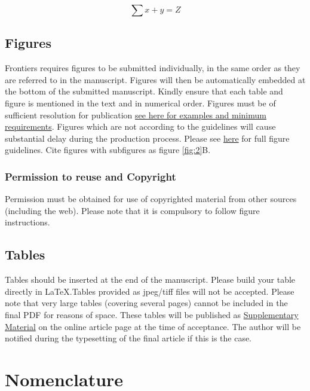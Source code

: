\documentclass[utf8]{frontiersSCNS} %
\begin{document}
\begin{equation}
\sum x+ y =Z\label{eq:01}
\end{equation}

\subsection{Figures}
Frontiers requires figures to be submitted individually, in the same order as they are referred to in the manuscript. Figures will then be automatically embedded at the bottom of the submitted manuscript. Kindly ensure that each table and figure is mentioned in the text and in numerical order. Figures must be of sufficient resolution for publication \href{http://home.frontiersin.org/about/author-guidelines#ResolutionRequirements}{see here for examples and minimum requirements}. Figures which are not according to the guidelines will cause substantial delay during the production process. Please see \href{http://home.frontiersin.org/about/author-guidelines#GeneralStyleGuidelinesforFigures}{here} for full figure guidelines. Cite figures with subfigures as figure \ref{fig:2}B.


\subsubsection{Permission to reuse and Copyright}
Permission must be obtained for use of copyrighted material from other sources (including the web). Please note that it is compulsory to follow figure instructions. 

\subsection{Tables}
Tables should be inserted at the end of the manuscript. Please build your table directly in LaTeX.Tables provided as jpeg/tiff files will not be accepted. Please note that very large tables (covering several pages) cannot be included in the final PDF for reasons of space. These tables will be published as \href{http://home.frontiersin.org/about/author-guidelines#SupplementaryMaterial}{Supplementary Material} on the online article page at the time of acceptance. The author will be notified during the typesetting of the final article if this is the case. 

\section{Nomenclature}
\end{document}
